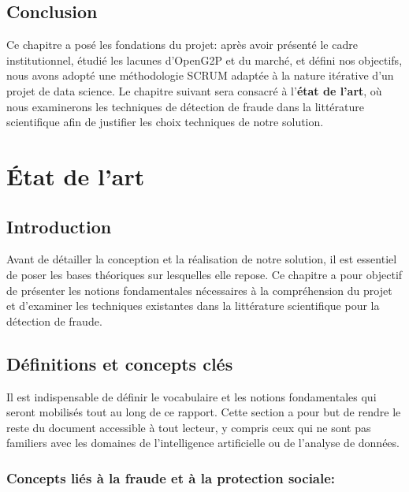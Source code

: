 \documentclass[a4paper, oneside, 12pt]{book}
\begin{document}
\section*{Conclusion}
\hspace{0.5cm}Ce chapitre a posé les fondations du projet: après avoir présenté le cadre institutionnel, étudié les lacunes d'OpenG2P et du marché, et défini nos objectifs, nous avons adopté une méthodologie SCRUM adaptée à la nature itérative d'un projet de data science. Le chapitre suivant sera consacré à l'\textbf{état de l'art}, où nous examinerons les techniques de détection de fraude dans la littérature scientifique afin de justifier les choix techniques de notre solution.


\chapter{État de l'art}

\section*{Introduction}
\hspace{0.5cm}Avant de détailler la conception et la réalisation de notre solution, il est essentiel de poser les bases théoriques sur lesquelles elle repose. Ce chapitre a pour objectif de présenter les notions fondamentales nécessaires à la compréhension du projet et d'examiner les techniques existantes dans la littérature scientifique pour la détection de fraude.

\section{Définitions et concepts clés}

\hspace{0.5cm}Il est indispensable de définir le vocabulaire et les notions fondamentales qui seront mobilisés tout au long de ce rapport. Cette section a pour but de rendre le reste du document accessible à tout lecteur, y compris ceux qui ne sont pas familiers avec les domaines de l'intelligence artificielle ou de l'analyse de données.


\subsection{Concepts liés à la fraude et à la protection sociale:}
\end{document}
